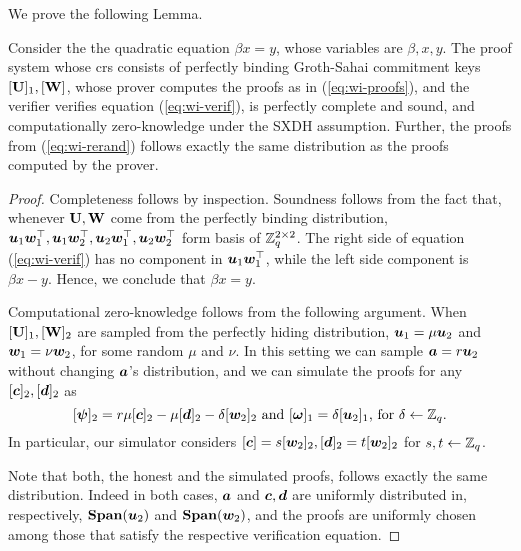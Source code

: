 We prove the following Lemma.
\begin{lemma} \label{lemma:betax=y}
Consider the the quadratic equation $\beta x = y$, whose variables are $\beta,x,y$. 
The proof system whose crs consists of perfectly binding Groth-Sahai commitment keys $[\mathbf{{U}}]_1,[\mathbf{{W}}]$, whose prover computes the proofs as in (\ref{eq:wi-proofs}), and the verifier verifies equation (\ref{eq:wi-verif}), is perfectly complete and sound, and computationally zero-knowledge under the SXDH assumption. Further, the proofs from (\ref{eq:wi-rerand}) follows exactly the same distribution as the proofs computed by the prover.
\end{lemma}
\begin{proof}
Completeness follows by inspection. 
Soundness follows from the fact that, whenever $\mathbf{{U}},\mathbf{{W}}$ come from the perfectly binding distribution, ${\boldsymbol{u}}_1{\boldsymbol{w}}_1^\top,{\boldsymbol{u}}_1{\boldsymbol{w}}_2^\top,\allowbreak{\boldsymbol{u}}_2{\boldsymbol{w}}_1^\top,\allowbreak{\boldsymbol{u}}_2{\boldsymbol{w}}_2^\top$ form basis of $\mathbb{Z}_q^{2\times 2}$.
The right side of equation (\ref{eq:wi-verif}) has no component in ${\boldsymbol{u}}_1{\boldsymbol{w}}^\top_1$, while the left side component is $\beta x-y$. Hence, we conclude that $\beta x = y$.

Computational zero-knowledge follows from the following argument.
When $[\mathbf{{U}}]_1,[\mathbf{{W}}]_2$ are sampled from the perfectly hiding distribution, ${\boldsymbol{u}}_1 = \mu{\boldsymbol{u}}_2$ and ${\boldsymbol{w}}_1  = \nu{\boldsymbol{w}}_2$, for some random $\mu$ and $\nu$. In this setting we can sample ${\boldsymbol{a}} = r{\boldsymbol{u}}_2$ without changing ${\boldsymbol{a}}$'s distribution, and we can simulate the proofs for any $[{\boldsymbol{c}}]_2,[{\boldsymbol{d}}]_2$ as 
\begin{equation} \label{eq:sim-proofs}
[{\boldsymbol{\psi}}]_2 = r\mu[{\boldsymbol{c}}]_2-\mu[{\boldsymbol{d}}]_2-\delta[{\boldsymbol{w}}_2]_2\text{ and }[{\boldsymbol{\omega}}]_1 = \delta[{\boldsymbol{u}}_2]_1\text{, for } \delta\gets\mathbb{Z}_q.
\end{equation} 
In particular, our simulator considers $[{\boldsymbol{c}}]=s[{\boldsymbol{w}}_2]_2,[{\boldsymbol{d}}]_2=t[{\boldsymbol{w}}_2]_2$ for $s,t\gets\mathbb{Z}_q$.

Note that both, the honest and the simulated proofs, follows exactly the same distribution. Indeed in both cases, ${\boldsymbol{a}}$ and ${\boldsymbol{c}},{\boldsymbol{d}}$ are uniformly distributed in, respectively, $\mathbf{Span}({\boldsymbol{u}}_2)$ and $\mathbf{Span}({\boldsymbol{w}}_2)$, and the proofs are uniformly chosen among those that satisfy the respective verification equation.


\end{proof}

